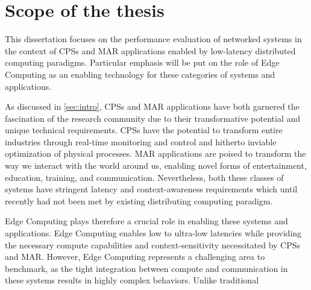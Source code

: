 \section{Scope of the thesis}
\glsresetall%



This dissertation focuses on the performance evaluation of networked systems in the context of \glspl{CPS} and \gls{MAR} applications enabled by low-latency distributed computing paradigms.
Particular emphasis will be put on the role of Edge Computing as an enabling technology for these categories of systems and applications.

As discussed in \cref{sec:intro}, \glspl{CPS} and \gls{MAR} applications have both garnered the fascination of the research community due to their transformative potential and unique technical requirements.
\glspl{CPS} have the potential to transform entire industries through real-time monitoring and control and hitherto inviable optimization of physical processes.
\gls{MAR} applications are poised to transform the way we interact with the world around us, enabling novel forms of entertainment, education, training, and communication.
Nevertheless, both these classes of systems have stringent latency and context-awareness requirements which until recently had not been met by existing distributing computing paradigm.

Edge Computing plays therefore a crucial role in enabling these systems and applications.
Edge Computing enables low to ultra-low latencies while providing the necessary compute capabilities and context-sensitivity necessitated by \glspl{CPS} and \gls{MAR}.
However, Edge Computing represents a challenging area to benchmark, as the tight integration between compute and communication in these systems results in highly complex behaviors.
Unlike traditional 

